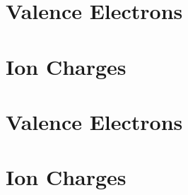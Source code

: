 \documentclass[landscape]{article}
\begin{document}
\begin{multicols*}{2}
  
\section*{Valence Electrons}

\ptable


\section*{Ion Charges}

\ptable

\columnbreak

\section*{Valence Electrons}

\ptable


\section*{Ion Charges}

\ptable






\end{multicols*}
\end{document}
